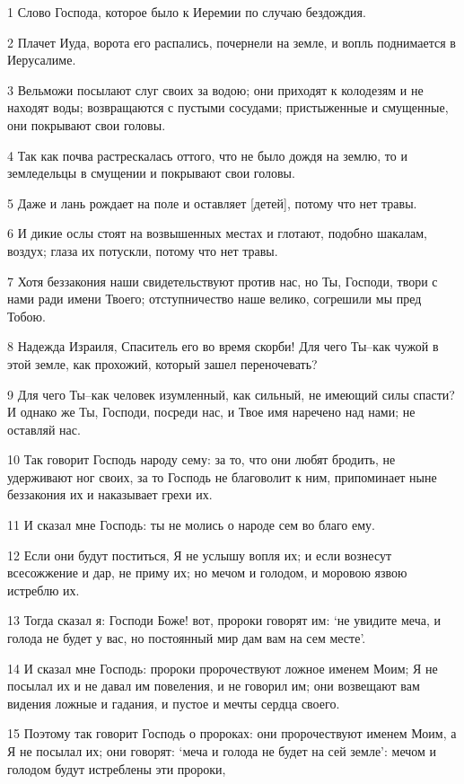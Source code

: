 \par 1 Слово Господа, которое было к Иеремии по случаю бездождия.
\par 2 Плачет Иуда, ворота его распались, почернели на земле, и вопль поднимается в Иерусалиме.
\par 3 Вельможи посылают слуг своих за водою; они приходят к колодезям и не находят воды; возвращаются с пустыми сосудами; пристыженные и смущенные, они покрывают свои головы.
\par 4 Так как почва растрескалась оттого, что не было дождя на землю, то и земледельцы в смущении и покрывают свои головы.
\par 5 Даже и лань рождает на поле и оставляет [детей], потому что нет травы.
\par 6 И дикие ослы стоят на возвышенных местах и глотают, подобно шакалам, воздух; глаза их потускли, потому что нет травы.
\par 7 Хотя беззакония наши свидетельствуют против нас, но Ты, Господи, твори с нами ради имени Твоего; отступничество наше велико, согрешили мы пред Тобою.
\par 8 Надежда Израиля, Спаситель его во время скорби! Для чего Ты--как чужой в этой земле, как прохожий, который зашел переночевать?
\par 9 Для чего Ты--как человек изумленный, как сильный, не имеющий силы спасти? И однако же Ты, Господи, посреди нас, и Твое имя наречено над нами; не оставляй нас.
\par 10 Так говорит Господь народу сему: за то, что они любят бродить, не удерживают ног своих, за то Господь не благоволит к ним, припоминает ныне беззакония их и наказывает грехи их.
\par 11 И сказал мне Господь: ты не молись о народе сем во благо ему.
\par 12 Если они будут поститься, Я не услышу вопля их; и если вознесут всесожжение и дар, не приму их; но мечом и голодом, и моровою язвою истреблю их.
\par 13 Тогда сказал я: Господи Боже! вот, пророки говорят им: `не увидите меча, и голода не будет у вас, но постоянный мир дам вам на сем месте'.
\par 14 И сказал мне Господь: пророки пророчествуют ложное именем Моим; Я не посылал их и не давал им повеления, и не говорил им; они возвещают вам видения ложные и гадания, и пустое и мечты сердца своего.
\par 15 Поэтому так говорит Господь о пророках: они пророчествуют именем Моим, а Я не посылал их; они говорят: `меча и голода не будет на сей земле': мечом и голодом будут истреблены эти пророки,
